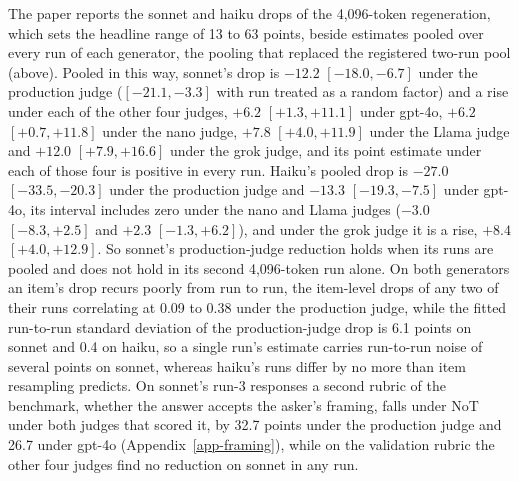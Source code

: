 The paper reports the sonnet and haiku drops of the 4,096-token
regeneration, which sets the headline range of 13 to 63 points, beside
estimates pooled over every run of each generator, the pooling that replaced
the registered two-run pool (above).
Pooled in this way, sonnet's drop is $-12.2$ $[-18.0, -6.7]$ under the
production judge ($[-21.1, -3.3]$ with run treated as a random factor) and a
rise under each of the other four judges, $+6.2$ $[+1.3, +11.1]$ under gpt-4o, $+6.2$ $[+0.7, +11.8]$
under the nano judge, $+7.8$ $[+4.0, +11.9]$ under the Llama judge and
$+12.0$ $[+7.9, +16.6]$ under the grok judge, and its point estimate under
each of those four is positive in every run.
Haiku's pooled drop is $-27.0$ $[-33.5, -20.3]$ under the production judge
and $-13.3$ $[-19.3, -7.5]$ under gpt-4o, its interval includes zero under
the nano and Llama judges ($-3.0$ $[-8.3, +2.5]$ and $+2.3$ $[-1.3, +6.2]$),
and under the grok judge it is a rise, $+8.4$ $[+4.0, +12.9]$.
So sonnet's production-judge reduction holds when its runs are pooled and
does not hold in its second 4,096-token run alone. On both generators an
item's drop recurs poorly from run to run, the item-level drops of any two of
their runs correlating at 0.09 to 0.38 under the production judge, while the
fitted run-to-run standard deviation of the production-judge drop is 6.1
points on sonnet and 0.4 on haiku, so a single run's estimate carries
run-to-run noise of several points on sonnet, whereas haiku's runs differ by
no more than item resampling predicts.
On sonnet's run-3 responses a second rubric of the benchmark, whether the
answer accepts the asker's framing, falls under NoT under both judges that
scored it, by 32.7 points under the production judge and 26.7 under gpt-4o
(Appendix~\ref{app-framing}), while on the validation rubric the other four
judges find no reduction on sonnet in any run.

